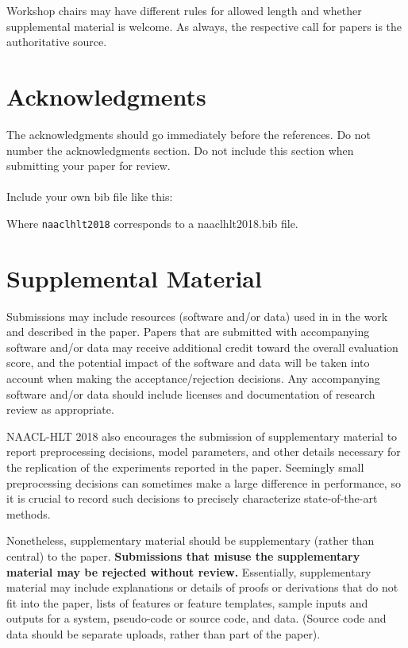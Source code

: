 \documentclass[11pt,a4paper]{article}
\begin{document}
Workshop chairs may have different rules for allowed length and
whether supplemental material is welcome. As always, the respective
call for papers is the authoritative source.

\section*{Acknowledgments}

The acknowledgments should go immediately before the references.  Do
not number the acknowledgments section. Do not include this section
when submitting your paper for review. \\

 \\

Include your own bib file like this:
\verb||
\verb||

Where \verb|naaclhlt2018| corresponds to a naaclhlt2018.bib file.



\appendix

\section{Supplemental Material}
\label{sec:supplemental}
Submissions may include resources (software and/or data) used in in the work and described in the paper. Papers that are submitted with accompanying software and/or data may receive additional credit toward the overall evaluation score, and the potential impact of the software and data will be taken into account when making the acceptance/rejection decisions. Any accompanying software and/or data should include licenses and documentation of research review as appropriate.


NAACL-HLT 2018 also encourages the submission of supplementary material to report preprocessing decisions, model parameters, and other details necessary for the replication of the experiments reported in the paper. Seemingly small preprocessing decisions can sometimes make a large difference in performance, so it is crucial to record such decisions to precisely characterize state-of-the-art methods. 

Nonetheless, supplementary material should be supplementary (rather
than central) to the paper. {\bf Submissions that misuse the supplementary 
material may be rejected without review.}
Essentially, supplementary material may include explanations or details
of proofs or derivations that do not fit into the paper, lists of
features or feature templates, sample inputs and outputs for a system,
pseudo-code or source code, and data. (Source code and data should
be separate uploads, rather than part of the paper).
\end{document}
